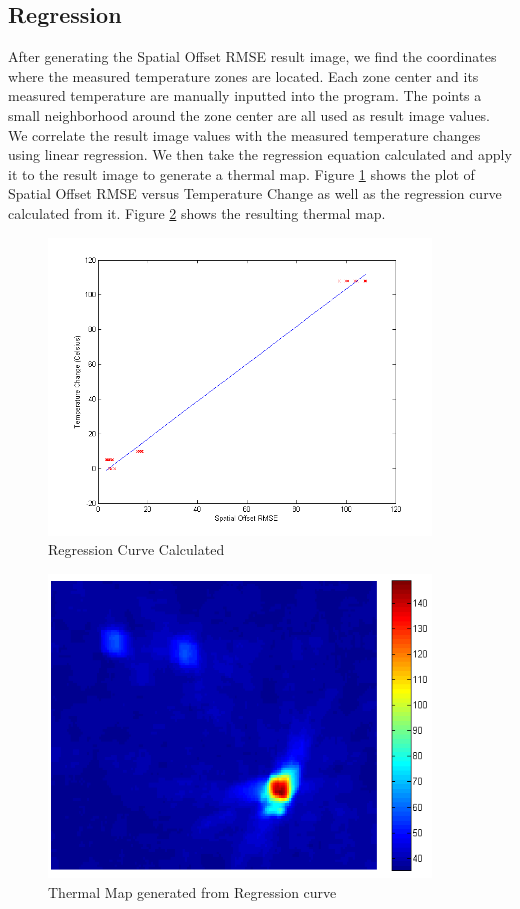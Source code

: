 \documentclass[]{spie}  %
\begin{document}
\subsection{Regression}

After generating the Spatial Offset RMSE result image, we find the coordinates where the measured temperature zones are located. Each zone center and its measured temperature are manually inputted into the program. The points a small neighborhood around the zone center are all used as result image values. We correlate the result image values with the measured temperature changes using linear regression. We then take the regression equation calculated and apply it to the result image to generate a thermal map. Figure \ref{RegressionCurve} shows the plot of Spatial Offset RMSE versus Temperature Change as well as the regression curve calculated from it. Figure \ref{ThermalMap} shows the resulting thermal map.

\begin{figure} 
\centering 
\includegraphics[width=4in]{slidingDiffRegression.png} 
\caption{Regression Curve Calculated} 
\label{RegressionCurve}
\end{figure}

\begin{figure} 
\centering 
\includegraphics[width=4in]{slidingDiffThermalMap.png} 
\caption{Thermal Map generated from Regression curve} 
\label{ThermalMap}
\end{figure}
\end{document}

